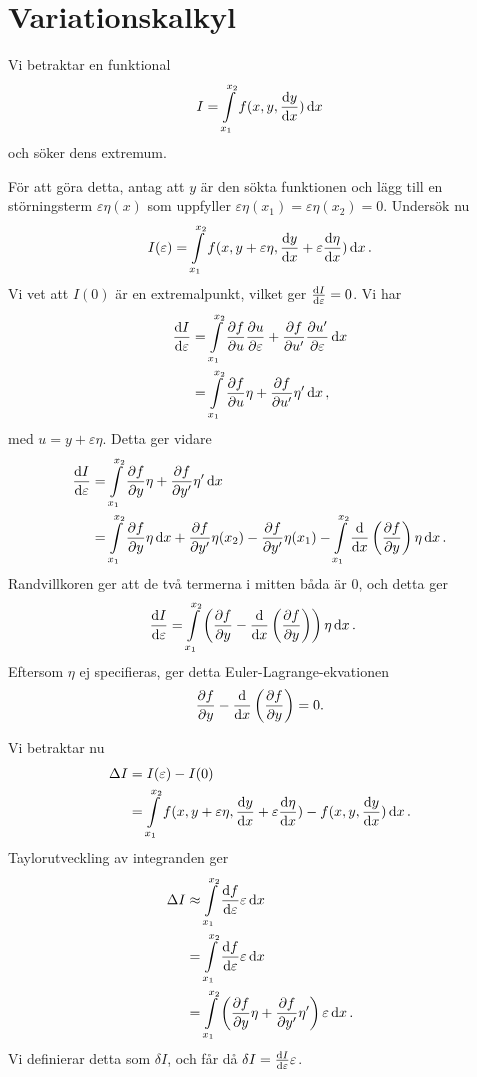 \section{Variationskalkyl}
Vi betraktar en funktional
\begin{align*}
	I = \int\limits_{x_{1}}^{x_{2}}f(x, y, \dv{y}{x})\dd{x}
\end{align*}
och söker dens extremum.

För att göra detta, antag att $y$ är den sökta funktionen och lägg till en störningsterm $\varepsilon\eta(x)$ som uppfyller $\varepsilon\eta(x_{1}) = \varepsilon\eta(x_{2}) = 0$. Undersök nu
\begin{align*}
	I(\varepsilon) = \int\limits_{x_{1}}^{x_{2}}f(x, y + \varepsilon\eta, \dv{y}{x} + \varepsilon\dv{\eta}{x})\dd{x}.
\end{align*}
Vi vet att $I(0)$ är en extremalpunkt, vilket ger $\dv{I}{\varepsilon} (0) = 0$. Vi har
\begin{align*}
	\dv{I}{\varepsilon} (\varepsilon) &= \int\limits_{x_{1}}^{x_{2}}\pdv{f}{u}\pdv{u}{\varepsilon} + \pdv{f}{u'}\pdv{u'}{\varepsilon}\dd{x} \\
	                                  &= \int\limits_{x_{1}}^{x_{2}}\pdv{f}{u}\eta + \pdv{f}{u'}\eta '\dd{x},
\end{align*}
med $u = y + \varepsilon\eta$. Detta ger vidare
\begin{align*}
	\dv{I}{\varepsilon} (0) &= \int\limits_{x_{1}}^{x_{2}}\pdv{f}{y}\eta + \pdv{f}{y'}\eta '\dd{x} \\
	                        &= \int\limits_{x_{1}}^{x_{2}}\pdv{f}{y}\eta\dd{x}  + \pdv{f}{y'} (x_{2})\eta(x_{2}) - \pdv{f}{y'} (x_{1})\eta(x_{1}) - \int\limits_{x_{1}}^{x_{2}}\dv{x}\left(\pdv{f}{y}\right)\eta\dd{x}.
\end{align*}
Randvillkoren ger att de två termerna i mitten båda är $0$, och detta ger
\begin{align*}
	\dv{I}{\varepsilon} (0) &= \int\limits_{x_{1}}^{x_{2}}\left(\pdv{f}{y} - \dv{x}\left(\pdv{f}{y}\right)\right)\eta\dd{x}.
\end{align*}
Eftersom $\eta$ ej specifieras, ger detta Euler-Lagrange-ekvationen
\begin{align*}
	\pdv{f}{y} - \dv{x}\left(\pdv{f}{y}\right) = 0.
\end{align*}

Vi betraktar nu
\begin{align*}
	\Delta I &= I(\varepsilon) - I(0) \\
	         &= \int\limits_{x_{1}}^{x_{2}}f(x, y + \varepsilon\eta, \dv{y}{x} + \varepsilon\dv{\eta}{x}) - f(x, y, \dv{y}{x})\dd{x}.
\end{align*}
Taylorutveckling av integranden ger
\begin{align*}
	\Delta I &\approx \int\limits_{x_{1}}^{x_{2}}\dv{f}{\varepsilon}\varepsilon\dd{x} \\
	         &= \int\limits_{x_{1}}^{x_{2}}\dv{f}{\varepsilon}\varepsilon\dd{x} \\
	         &= \int\limits_{x_{1}}^{x_{2}}\left(\pdv{f}{y}\eta + \pdv{f}{y'}\eta '\right)\varepsilon\dd{x}.
\end{align*}
Vi definierar detta som $\delta I$, och får då $\delta I = \dv{I}{\varepsilon} (0)\varepsilon$.